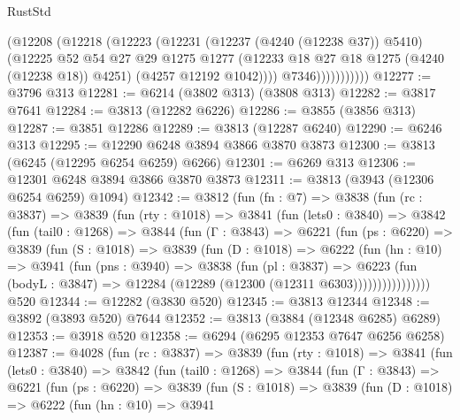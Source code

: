 \begin{lexlean}{RustStd}
\begin{coremodule}
                      (@12208
                        (@12218
                          (@12223
                            (@12231
                              (@12237 (@4240 (@12238 @37)) @5410)
                              (@12225
                                @52
                                @54
                                @27
                                @29
                                @1275
                                @1277
                                (@12233 @18 @27 @18 @1275 (@4240 (@12238 @18)) @4251)
                                (@4257 @12192 @1042))))
                          @7346)))))))))))
@12277 := @3796 @313
@12281 := @6214 (@3802 @313) (@3808 @313)
@12282 := @3817 @7641
@12284 := @3813 (@12282 @6226)
@12286 := @3855 (@3856 @313)
@12287 := @3851 @12286
@12289 := @3813 (@12287 @6240)
@12290 := @6246 @313
@12295 := @12290 @6248 @3894 @3866 @3870 @3873
@12300 := @3813 (@6245 (@12295 @6254 @6259) @6266)
@12301 := @6269 @313
@12306 := @12301 @6248 @3894 @3866 @3870 @3873
@12311 := @3813 (@3943 (@12306 @6254 @6259) @1094)
@12342 := @3812
    (fun (fn : @7) =>
    @3838
      (fun (rc : @3837) =>
      @3839
        (fun (rty : @1018) =>
        @3841
          (fun (lets0 : @3840) =>
          @3842
            (fun (tail0 : @1268) =>
            @3844
              (fun (Γ : @3843) =>
              @6221
                (fun (ps : @6220) =>
                @3839
                  (fun (S : @1018) =>
                  @3839
                    (fun (D : @1018) =>
                    @6222
                      (fun (hn : @10) =>
                      @3941
                        (fun (pns : @3940) =>
                        @3838
                          (fun (pl : @3837) =>
                          @6223
                            (fun (bodyL : @3847) =>
                            @12284 (@12289 (@12300 (@12311 @6303))))))))))))))))
    @520
@12344 := @12282 (@3830 @520)
@12345 := @3813 @12344
@12348 := @3892 (@3893 @520) @7644
@12352 := @3813 (@3884 (@12348 @6285) @6289)
@12353 := @3918 @520
@12358 := @6294 (@6295 @12353 @7647 @6256 @6258)
@12387 := @4028
    (fun (rc : @3837) =>
    @3839
      (fun (rty : @1018) =>
      @3841
        (fun (lets0 : @3840) =>
        @3842
          (fun (tail0 : @1268) =>
          @3844
            (fun (Γ : @3843) =>
            @6221
              (fun (ps : @6220) =>
              @3839
                (fun (S : @1018) =>
                @3839
                  (fun (D : @1018) =>
                  @6222
                    (fun (hn : @10) =>
                    @3941

\end{coremodule}
\end{lexlean}
